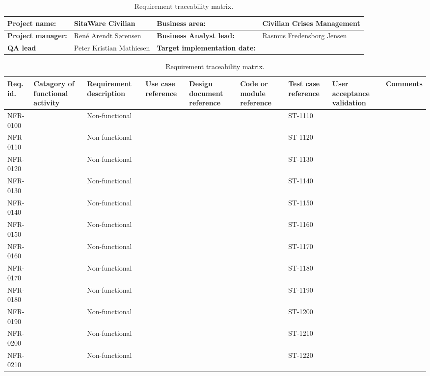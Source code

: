 \begin{sidewaystable}
\begin{table}[H]
\begin{tabular}{|l|l|l|l|}
\hline
 \textbf{Project name:} & SitaWare Civilian & \textbf{Business area:}  & Civilian Crises Management\\ \hline
 \textbf{Project manager:} & René Arendt Sørensen & \textbf{Business Analyst lead:} & Rasmus Fredensborg  Jensen\\ \hline
 \textbf{QA lead} & Peter Kristian Mathiesen & \textbf{Target implementation date:}  & \\ \hline
\end{tabular}	
\begin{tabular}{|p{2cm}|p{2cm}|p{3cm}|p{2cm}|p{2cm}|p{2cm}|p{2cm}|p{2cm}|p{2cm}|}
\hline
 Req. id. & Catagory of functional activity & Requirement description  & Use case reference & Design document reference & Code or module reference & Test case reference & User acceptance validation & Comments\\ \hline
 NFR-0100 &  & Non-functional & & & & ST-1110 & &\\ \hline
 NFR-0110 &  & Non-functional & & & & ST-1120 & &\\ \hline
 NFR-0120 &  & Non-functional & & & & ST-1130 & &\\ \hline
 NFR-0130 &  & Non-functional & & & & ST-1140 & &\\ \hline
 NFR-0140 &  & Non-functional & & & & ST-1150 & &\\ \hline
 NFR-0150 &  & Non-functional & & & & ST-1160 & &\\ \hline
 NFR-0160 &  & Non-functional & & & & ST-1170 & &\\ \hline
 NFR-0170 &  & Non-functional & & & & ST-1180 & &\\ \hline
 NFR-0180 &  & Non-functional & & & & ST-1190 & &\\ \hline
 NFR-0190 &  & Non-functional & & & & ST-1200 & &\\ \hline
 NFR-0200 &  & Non-functional & & & & ST-1210 & &\\ \hline
 NFR-0210 &  & Non-functional & & & & ST-1220 & &\\ \hline
\end{tabular}	
\caption{Requirement traceability matrix.}
\end{table}

\end{sidewaystable}